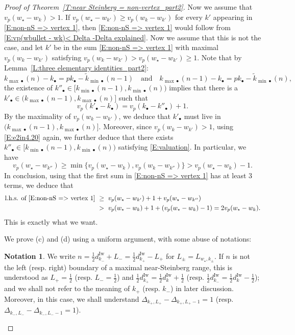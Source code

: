 \documentclass[12pt]{amsart}
\theoremstyle{definition}
\newtheorem{notation}[subsection]{Notation}
\numberwithin{equation}{subsection}
\newcommand{\Iw}{\mathrm{Iw}}
\begin{document}
\begin{proof}[Proof of Theorem~\ref{T:near Steinberg = non-vertex_part2}]
Now we assume that $v_p(w_\star - w_k) >1$.
If $v_p(w_\star - w_{k'}) \geq  v_p(w_k-w_{k'})$ for every $k'$ appearing in \eqref{E:non-nS => vertex 1}, then \eqref{E:non-nS => vertex 1} would follow from \eqref{E:vp(wbullet - wk)< Delta -Delta explained}. Now we assume that this is not the case, and let $k'$ be in the sum \eqref{E:non-nS => vertex 1} with maximal $v_p(w_k-w_{k'})$ satisfying $v_p(w_k-w_{k'})>v_p(w_\star - w_{k'}) \geq  1$. Note that by Lemma~\ref{L:three elementary identities_part2}:
\begin{equation}
\label{E:e2in4.20}
k_{{\max}\bullet}(n) - k_\bullet = pk_\bullet - \tilde k_{{\min}\bullet}(n -1)  \quad \textrm{and} \quad k_{{\max}\bullet}(n-1) - k_\bullet = pk_\bullet - \tilde k_{{\min}\bullet}(n),
\end{equation}
the existence of $k''_\bullet \in [k_{{\min}\bullet}(n-1) , k_{{\min}\bullet}(n))$ implies that there is a $k'_\bullet\in (k_{{\max}\bullet}(n-1), k_{{\max}\bullet}(n)]$ such that 
\begin{equation}
\label{E:valuation}
v_p(k'_\bullet - k_\bullet) = v_p(k_\bullet - k''_\bullet) +1.
\end{equation}
By the maximality of $v_p(w_k-w_{k'})$, we deduce that $k'_\bullet$ must live in $(k_{{\max}\bullet}(n-1), k_{{\max}\bullet}(n)]$. Moreover, since $v_p(w_k-w_{k'})>1$, using \eqref{E:e2in4.20} again, we further deduce that there exists $k''_\bullet \in [k_{{\min}\bullet}(n-1) , k_{{\min}\bullet}(n))$ satisfying \eqref{E:valuation}. In particular, we have
$$
v_p(w_\star - w_{k''}) \geq \min\{v_p(w_\star - w_{k}), v_p(w_k - w_{k''}) \} > v_p(w_\star - w_k)-1.
$$
In conclusion, using that the first sum in \eqref{E:non-nS => vertex 1} has at least $3$ terms, we deduce that
\begin{align*}
\textrm{l.h.s. of \eqref{E:non-nS => vertex 1}}\ &\geq \ v_p(w_\star - w_{k'}) + 1 + v_p(w_\star - w_{k''}) \\
 &> \
v_p(w_\star - w_{k})+1 + (v_p(w_\star - w_k)-1) = 2v_p(w_\star - w_{k}).
\end{align*}
This is exactly what we want.

\medskip
We prove (c) and (d) using a uniform argument, with some abuse of notations: 

\begin{notation}\label{Notation:L+ and L-}
	We write $n = \frac 12 d_{k_-}^\Iw + L_- = \frac 12 d_{k_+}^\Iw - L_+$ for $L_\pm= L_{w_\star, k_\pm}$. If $n$ is not the left (resp. right) boundary of a maximal near-Steinberg range, this is understood as $L_+ = \frac 12$ (resp. $L_- = \frac 12$) and $\frac 12d_{k_+}^\Iw = \frac 12 d_k^\Iw +\frac 12$ (resp. $\frac 12d_{k_-}^\Iw = \frac 12 d_k^\Iw -\frac 12$); and we shall not refer to the meaning of $k_+$ (resp. $k_-$) in later discussion. Moreover, in this case, we shall understand $\Delta_{k_+, L_+} - \Delta_{k_+, L_+-1} = 1$ (resp. $\Delta_{k_-, L_-} - \Delta_{k_-, L_--1} = 1$).
\end{notation}



\end{proof}
\end{document}
